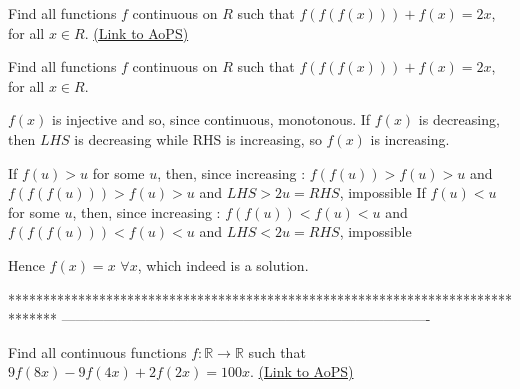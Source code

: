 \begin{problem}
	Find all functions $f$ continuous on $R$ such that $f(f(f(x)))+f(x)=2x$, for all $x{\in}R$.
	\flushright \href{https://artofproblemsolving.com/community/c6h563254}{(Link to AoPS)}
\end{problem}



\begin{solution}
	\begin{tcolorbox}Find all functions $f$ continuous on $R$ such that $f(f(f(x)))+f(x)=2x$, for all $x{\in}R$.\end{tcolorbox}
$f(x)$ is injective and so, since continuous, monotonous.
If $f(x)$ is decreasing, then $LHS$ is decreasing while RHS is increasing, so $f(x)$ is increasing.

If $f(u)>u$ for some $u$, then, since increasing : $f(f(u))>f(u)>u$ and $f(f(f(u)))>f(u)>u$ and $LHS > 2u=RHS$, impossible
If $f(u)<u$ for some $u$, then, since increasing : $f(f(u))<f(u)<u$ and $f(f(f(u)))<f(u)<u$ and $LHS < 2u=RHS$, impossible

Hence $\boxed{f(x)=x}$ $\forall x$, which indeed is a solution.
\end{solution}
*******************************************************************************
-------------------------------------------------------------------------------

\begin{problem}
	Find all continuous functions $f: \mathbb{R}\to\mathbb{R}$ such that  $9f(8x)-9f(4x)+2f(2x)=100x$.
	\flushright \href{https://artofproblemsolving.com/community/c6h563255}{(Link to AoPS)}
\end{problem}



